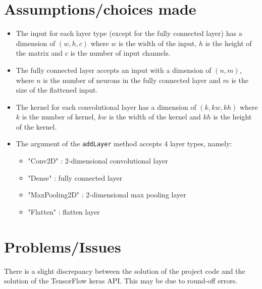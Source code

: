 \documentclass[12pt]{amsart}
\begin{document}
\section{Assumptions/choices made}
\begin{itemize}
	\item The input for each layer type (except for the fully connected layer) has a dimension of $(w, h, c)$ where $w$ is the width of the input, $h$ is the height of the matrix and $c$ is the number of input channels.
	\item The fully connected layer accepts an input with a dimension of $(n,m)$, where $n$ is the number of neurons in the fully connected layer and $m$ is the size of the flattened input.
	\item The kernel for each convolutional layer has a dimension of $(k, kw, kh)$ where $k$ is the number of kernel, $kw$ is the width of the kernel and $kh$ is the height of the kernel. 
	\item The argument of the \texttt{addLayer} method accepts 4 layer types, namely:
	 \begin{itemize}
	 	\item "Conv2D" 		 : 2-dimensional convolutional layer 
	 	\item "Dense"  		 : fully connected layer 
	 	\item "MaxPooling2D" : 2-dimensional max pooling layer
	 	\item "Flatten" 	 : flatten layer 
	 \end{itemize}
\end{itemize}

\section{Problems/Issues}
There is a slight discrepancy between the solution of the project code and the solution of the TensorFlow keras API. This may be due to round-off errors.
\end{document}
